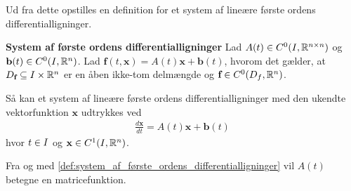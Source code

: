 Ud fra dette opstilles en definition for et system af lineære første ordens differentialligninger.
%
\begin{minipage}\textwidth
\begin{defn}\label{def:system_af_første_ordens_differentialligninger}\textbf{System af første ordens differentialligninger} %
\newline
Lad $A(t) \in C^0(I, \mathbb{R}^{n \times n})$ og $\textbf{b}(t) \in C^0(I, \mathbb{R}^n)$. Lad $\textbf{f}(t,\textbf{x})=A(t)\textbf{x}+\textbf{b}(t)$, hvorom det gælder, at $D_\textbf{f} \subseteq I \times \mathbb{R}^n$ er en åben ikke-tom delmængde og $\textbf{f}\in C^0(D_f, \mathbb{R}^n)$.


Så kan et system af lineære første ordens differentialligninger med den ukendte vektorfunktion $\textbf{x}$ udtrykkes ved
\begin{align}
    \frac{d\textbf{x}}{dt} = A(t)\textbf{x} + \textbf{b}(t)
\end{align}
hvor $t \in I$ og $\textbf{x}\in C^1(I, \mathbb{R}^n)$.

\end{defn}
\end{minipage}

Fra og med \autoref{def:system_af_første_ordens_differentialligninger} vil $A(t)$ betegne en matricefunktion. 
